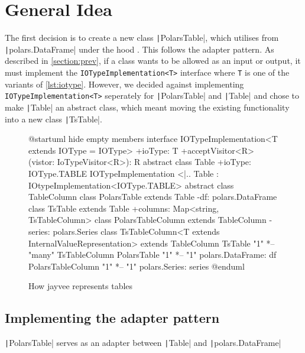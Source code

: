 \section{General Idea}
\label{section:General Idea}
The first decision is to create a new class \texttt|PolarsTable|, which utilises from \texttt|polars.DataFrame| under the hood %
. This follows the adapter pattern.
As described in \ref{section:prev}, if a class wants to be allowed as an input or output, it must implement the \texttt{IOTypeImplementation<T>} interface where \texttt{T} is one of the variants of \ref{lst:iotype}.
However, we decided against implementing \texttt{IOTypeImplementation<T>} seperately for \texttt|PolarsTable| and \texttt|Table| and chose to make \texttt|Table| an abstract class, which meant moving the existing functionality into a new class \texttt|TsTable|.
\begin{figure}
	\begin{plantuml}
		@startuml
		hide empty members
		interface IOTypeImplementation<T extends IOType = IOType> {
				+ioType: T
				+acceptVisitor<R>(vistor: IoTypeVisitor<R>): R
			}
		abstract class Table {
				+ioType: IOType.TABLE
			}
		IOTypeImplementation <|.. Table : IOtypeImplementation<IOType.TABLE>
		abstract class TableColumn {
			}
		class PolarsTable extends Table {
				-df: polars.DataFrame
			}
		class TsTable extends Table {
				+columns: Map<string, TsTableColumn>
			}
		class PolarsTableColumn extends TableColumn {
				-series: polars.Series
			}
		class TsTableColumn<T extends InternalValueRepresentation> extends TableColumn {
			}
		TsTable "1" *-- "many" TsTableColumn
		PolarsTable "1" *-- "1" polars.DataFrame: df
		PolarsTableColumn "1" *-- "1" polars.Series: series
		@enduml
	\end{plantuml}
	\caption{How jayvee represents tables} %
	\label{fig:current_sit}
\end{figure}


\subsection{Implementing the adapter pattern}
\label{subsection:adapter}

\texttt|PolarsTable| serves as an adapter between \texttt|Table| and \texttt|polars.DataFrame|
